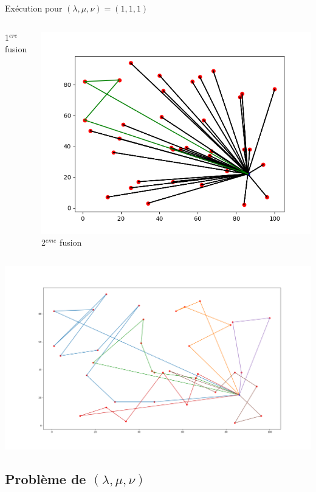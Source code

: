 \documentclass{beamer}
\begin{document}
\begin{frame}{Exécution pour $(\lambda,\mu,\nu) = (1,1,1)$}
\begin{columns}[t]
\begin{column}{4cm}
 	1$^{ere}$ fusion
  \end{column}

 
  \begin{column}{4cm}
  	\centering
	\includegraphics[scale=0.25]{CW2.png}
 	2$^{eme}$ fusion

  \end{column}
 \end{columns}
 
 \centering
 \includegraphics[scale=0.13]{resCW101010.png}
\end{frame}

\subsection{Problème de $(\lambda,\mu,\nu)$}
\end{document}
